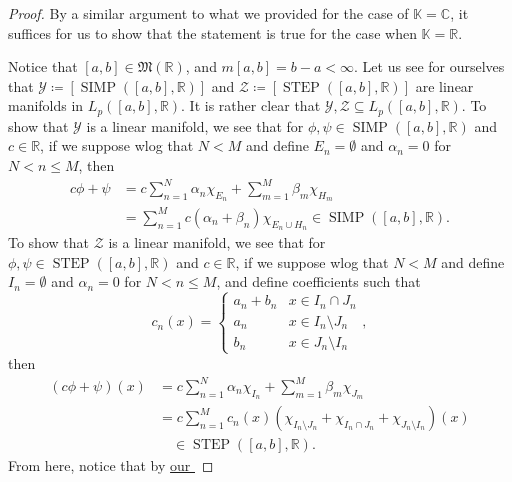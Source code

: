 \documentclass[notoc,notitlepage]{tufte-book}
\DeclareMathOperator{\SIMP}{SIMP}
\DeclareMathOperator{\STEP}{STEP}
\begin{document}
\begin{proof}
  By a similar argument to what we provided for the case of $\mathbb{K} = \mathbb{C}$,
  it suffices for us to show that the statement is true for the case when
  $\mathbb{K} = \mathbb{R}$.

  Notice that $[a, b] \in \mathfrak{M}(\mathbb{R})$,
  and $m[a, b] = b - a < \infty$.
  Let us see for ourselves that $\mathcal{Y} \coloneqq [\SIMP([a, b], \mathbb{R})]$
  and $\mathcal{Z} \coloneqq [\STEP([a, b], \mathbb{R})]$
  are linear manifolds in $L_p([a, b], \mathbb{R})$.
  It is rather clear that
  $\mathcal{Y}, \mathcal{Z} \subseteq L_p([a, b], \mathbb{R})$.
  To show that $\mathcal{Y}$ is a linear manifold, we see that
  for $\phi, \psi \in \SIMP([a, b], \mathbb{R})$ and $c \in \mathbb{R}$,
  if we suppose wlog that $N < M$
  and define $E_n = \emptyset$ and $\alpha_n = 0$ for $N < n \leq M$, then
  \begin{align*}
    c \phi + \psi
    &= c \sum_{n=1}^{N} \alpha_n \chi_{E_n} + \sum_{m=1}^{M} \beta_m \chi_{H_m}
      \\
    &= \sum_{n=1}^{M} c (\alpha_n + \beta_n) \chi_{E_n \cup H_n}
      \in \SIMP([a, b], \mathbb{R}).
  \end{align*}
  To show that $\mathcal{Z}$ is a linear manifold, we see that
  for \\ \noindent
  $\phi, \psi \in \STEP([a, b], \mathbb{R})$ and $c \in \mathbb{R}$,
  if we suppose wlog that $N < M$ 
  and define $I_n = \emptyset$ and $\alpha_n = 0$ for $N < n \leq M$,
  and define coefficients such that
  \begin{equation*}
    c_n(x) = \begin{cases}
      a_n + b_n & x \in I_n \cap J_n \\
      a_n & x \in I_n \setminus J_n \\
      b_n & x \in J_n \setminus I_n
    \end{cases},
  \end{equation*}
  then
  \begin{align*}
    (c \phi + \psi)(x)
    &= c \sum_{n=1}^{N} \alpha_n \chi_{I_n} + \sum_{m=1}^{M} \beta_m \chi_{J_m}
      \\
    &= c \sum_{n=1}^{M} c_n(x) (\chi_{I_n \setminus J_n} +
      \chi_{I_n \cap J_n} + \chi_{J_n \setminus I_n})(x) \\
    & \quad\in \STEP([a, b], \mathbb{R}).
  \end{align*}
  From here, notice that by
  \hyperref[warning:step_functions_are_simple_but_the_converse_is_false]{our
}
\end{proof}
\end{document}
